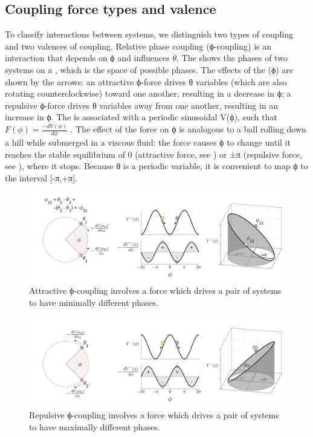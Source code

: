 \subsection{Coupling force types and valence} 

To classify interactions between systems, we distinguish two types of coupling and two valences of coupling. Relative phase coupling (ϕ-coupling) is an interaction that depends on  ϕ and influences $\dot{θ}$. The {} shows the phases of two systems on a , which is the space of possible phases. The effects of the  (ϕ)  are shown by the arrows: an attractive ϕ-force drives θ variables (which are also rotating counterclockwise) toward one another, resulting in a decrease in ϕ; a repulsive ϕ-force drives θ variables away from one another, resulting in an increase in ϕ. The  is associated with a periodic sinusoidal  V(ϕ), such that  $F\left(\phi \right)=\frac{-{dV}\left(\phi \right)}{{d\phi} }$ . The effect of the force on ϕ is analogous to a ball rolling down a hill while submerged in a viscous fluid: the force causes ϕ to change until it reaches the stable equilibrium of 0 (attractive force, see {}) or ±π (repulsive force, see {}), where it stops. Because θ is a periodic variable, it is convenient to map ϕ to the interval [-π,+π]. 

  
\begin{figure}
\includegraphics[width=\textwidth]{figures/Tilsen-img18.png}
\caption{Attractive ϕ-coupling involves a force which drives a pair of systems to have minimally different phases.}
\label{fig:2:11}
\end{figure}
 

  
\begin{figure}
\includegraphics[width=\textwidth]{figures/Tilsen-img19.png}
\caption{Repulsive ϕ-coupling involves a force which drives a pair of systems to have maximally different phases.}
\label{fig:2:12}
\end{figure}
 

